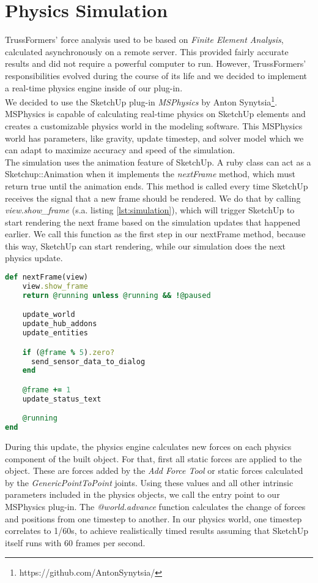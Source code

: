 \section{Physics Simulation}\label{sec:simulation}
TrussFormers' force analysis used to be based on \textit{Finite Element Analysis}, calculated asynchronously on a remote server. This provided fairly accurate results and did not require a powerful computer to run. However, TrussFormers' responsibilities evolved during the course of its life and we decided to implement a real-time physics engine inside of our plug-in.\\
We decided to use the SketchUp plug-in \textit{MSPhysics} by Anton Synytsia\footnote{https://github.com/AntonSynytsia/}. MSPhysics is capable of calculating real-time physics on SketchUp elements and creates a customizable physics world in the modeling software. This MSPhysics world has parameters, like gravity, update timestep, and solver model which we can adapt to maximize accuracy and speed of the simulation.\\
The simulation uses the animation feature of SketchUp. A ruby class can act as a Sketchup::Animation when it implements the \textit{nextFrame} method, which must return true until the animation ends. This method is called every time SketchUp receives the signal that a new frame should be rendered. We do that by calling \textit{view.show\_frame} (s.a. listing \ref{lst:simulation}), which will trigger SketchUp to start rendering the next frame based on the simulation updates that happened earlier. We call this function as the first step in our nextFrame method, because this way, SketchUp can start rendering, while our simulation does the next physics update.\\
\begin{lstlisting}[language=Ruby, label={lst:simulation}, caption=Simulation nextFrame method]
def nextFrame(view)
    view.show_frame
    return @running unless @running && !@paused

    update_world
    update_hub_addons
    update_entities

    if (@frame % 5).zero?
      send_sensor_data_to_dialog
    end

    @frame += 1
    update_status_text

    @running
end
\end{lstlisting}
During this update, the physics engine calculates new forces on each physics component of the built object. For that, first all static forces are applied to the object. These are forces added by the \textit{Add Force Tool} or static forces calculated by the \textit{GenericPointToPoint} joints. Using these values and all other intrinsic parameters included in the physics objects, we call the entry point to our MSPhysics plug-in. The \textit{@world.advance} function calculates the change of forces and positions from one timestep to another. In our physics world, one timestep correlates to 1/60s, to achieve realistically timed results assuming that SketchUp itself runs with 60 frames per second.\\

